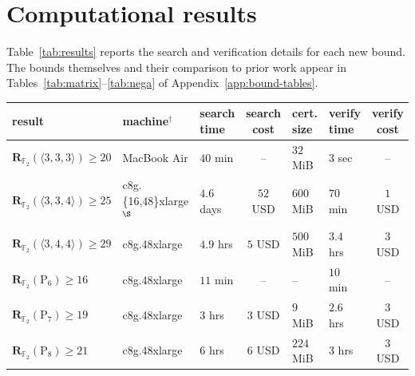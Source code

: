 \documentclass[11pt]{article}
\theoremstyle{definition}
\newcommand{\F}{\mathbb{F}}
\newcommand{\Rk}[2]{\mathbf{R}_{#1}(#2)}
\newcommand{\Fullt}[1]{\mathrm{P}_{#1}}
\newcommand{\mmt}[3]{\langle #1,#2,#3\rangle}
\begin{document}
\section{Computational results}\label{app:results}

Table~\ref{tab:results} reports the search and verification details for each new bound.
The bounds themselves and their comparison to prior work appear in
Tables~\ref{tab:matrix}--\ref{tab:nega} of Appendix~\ref{app:bound-tables}.

\begin{table}[!ht]
  \centering
  \setlength{\tabcolsep}{4pt}
  \begin{tabular}{lllcllc}
    \toprule
    result                                    & machine$^\dagger$        & \shortstack{search\\time} & \shortstack{search\\cost} & \shortstack{cert.\\size} & \shortstack{verify\\time} & \shortstack{verify\\cost} \\
    \midrule
    $\Rk{\F_2}{\mmt{3}{3}{3}}\ge 20$          & MacBook Air              & $40$ min                  & --                        & $32$ MiB                 & $3$ sec                   & --                        \\
    $\Rk{\F_2}{\mmt{3}{3}{4}}\ge 25$          & c8g.\{16,48\}xlarge$^\S$ & $4.6$ days                & $52$ USD                  & $600$ MiB                & $70$ min                  & $1$ USD                   \\
    $\Rk{\F_2}{\mmt{3}{4}{4}}\ge 29$          & c8g.48xlarge             & $4.9$ hrs                 & $5$ USD                   & $500$ MiB                & $3.4$ hrs                 & $3$ USD                   \\
    \midrule
    $\Rk{\F_2}{\Fullt{6}}\ge 16$              & c8g.48xlarge             & $11$ min                  & --                        & --                       & $10$ min                  & --                        \\
    $\Rk{\F_2}{\Fullt{7}}\ge 19$              & c8g.48xlarge             & $3$ hrs                   & $3$ USD                   & $9$ MiB                  & $2.6$ hrs                 & $3$ USD                   \\
    $\Rk{\F_2}{\Fullt{8}}\ge 21$              & c8g.48xlarge             & $6$ hrs                   & $6$ USD                   & $224$ MiB                & $3$ hrs                   & $3$ USD                   \\

\end{tabular}
\end{table}
\end{document}

